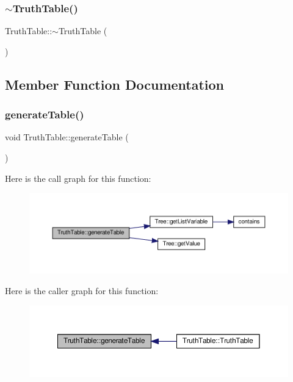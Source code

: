 \subsubsection{\texorpdfstring{$\sim$\+Truth\+Table()}{~TruthTable()}}
{\footnotesize\ttfamily Truth\+Table\+::$\sim$\+Truth\+Table (\begin{DoxyParamCaption}{ }\end{DoxyParamCaption})}



\subsection{Member Function Documentation}
\mbox{\label{class_truth_table_ab113db56063be5ecf661ebc7fc439aee}} 
\subsubsection{\texorpdfstring{generate\+Table()}{generateTable()}}
{\footnotesize\ttfamily void Truth\+Table\+::generate\+Table (\begin{DoxyParamCaption}{ }\end{DoxyParamCaption})\hspace{0.3cm}{\ttfamily [private]}}

Here is the call graph for this function\+:\nopagebreak
\begin{figure}[H]
\begin{center}
\leavevmode
\includegraphics[width=350pt]{dc/d49/class_truth_table_ab113db56063be5ecf661ebc7fc439aee_cgraph}
\end{center}
\end{figure}
Here is the caller graph for this function\+:\nopagebreak
\begin{figure}[H]
\begin{center}
\leavevmode
\includegraphics[width=350pt]{dc/d49/class_truth_table_ab113db56063be5ecf661ebc7fc439aee_icgraph}
\end{center}
\end{figure}
\mbox{\label{class_truth_table_ae44f1c65f1d2e8c350eb7f17bd88f777}} 
